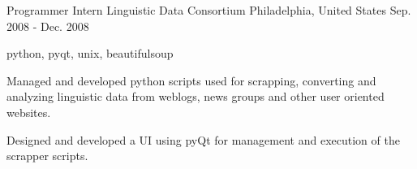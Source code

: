 \cventry
    {Programmer Intern} %
    {Linguistic Data Consortium} %
    {Philadelphia, United States} %
    {Sep. 2008 - Dec. 2008} %
    {
    \begin{cvitems} %
        \item { python, pyqt, unix, beautifulsoup}
        \item { Managed and developed python scripts used for scrapping, converting and analyzing linguistic data from weblogs, news groups and other user oriented websites.}
        \item { Designed and developed a UI using pyQt for management and execution of the scrapper scripts.}
    \end{cvitems}
    }